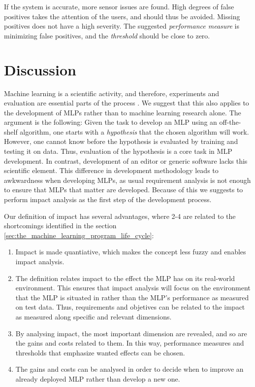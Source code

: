 \documentclass{article}
\theoremstyle{theorem}
\theoremstyle{definition}
\begin{document}
If the system is accurate, more sensor issues are found.
High degrees of false positives takes the attention of the users, and should thus be avoided. 
Missing positives does not have a high severity.
The suggested \emph{performance measure} is minimizing false positives, and the \emph{threshold} should be close to zero.

\section{Discussion}
\label{sec:discussion}
Machine learning is a scientific activity, and therefore, experiments and evaluation are essential parts of the process \cite{Langley_1988}.
We suggest that this also applies to the development of MLPs rather than to machine learning research alone.
The argument is the following: 
Given the task to develop an MLP using an off-the-shelf algorithm, one starts with a \emph{hypothesis} that the chosen algorithm will work.
However, one cannot know before the hypothesis is evaluated by training and testing it on data.
Thus, evaluation of the hypothesis is a core task in MLP development.
In contrast, development of an editor or generic software lacks this scientific element.
This difference in development methodology leads to awkwardness when developing MLPs, as usual requirement analysis is not enough to ensure that MLPs that matter are developed.
Because of this we suggests to perform impact analysis as the first step of the development process.

Our definition of impact has several advantages, where 2-4 are related to the shortcomings identified in the section \ref{sec:the_machine_learning_program_life_cycle}:

\begin{enumerate}

\item
Impact is made quantiative, which makes the concept less fuzzy and enables impact analysis.


\item
The definition relates impact to the effect the MLP has on its real-world environment. 
This ensures that impact analysis will focus on the environment that the MLP is situated in rather than the MLP's performance as measured on test data. 
Thus, requirements and objetives can be related to the impact as measured along specific and relevant dimensions.

\item
By analysing impact, the most important dimension are revealed, and so are the gains and costs related to them.
In this way, performance measures and thresholds that emphasize wanted effects can be chosen.

\item
The gains and costs can be analysed in order to decide when to improve an already deployed MLP rather than develop a new one.
\end{enumerate}
\end{document}
